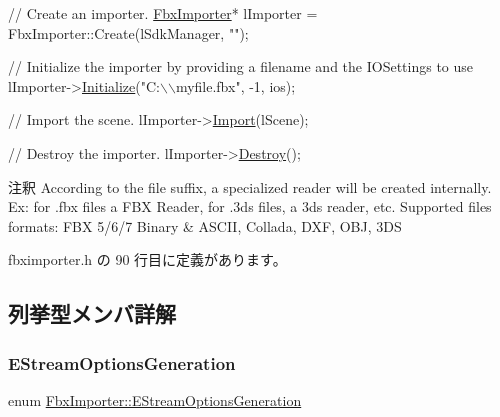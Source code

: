 \begin{DoxyEnumerate}
\begin{DoxyCode}
\textcolor{comment}{// Create an importer.}
\hyperlink{class_fbx_importer}{FbxImporter}* lImporter = FbxImporter::Create(lSdkManager, \textcolor{stringliteral}{""});

\textcolor{comment}{// Initialize the importer by providing a filename and the IOSettings to use}
lImporter->\hyperlink{class_fbx_importer_a70528a9ca1ff737bda9696a2073acd13}{Initialize}(\textcolor{stringliteral}{"C:\(\backslash\)\(\backslash\)myfile.fbx"}, -1, ios);

\textcolor{comment}{// Import the scene.}
lImporter->\hyperlink{class_fbx_importer_a1c5a7f9ee8a6952c1e039065cfa09659}{Import}(lScene); 

\textcolor{comment}{// Destroy the importer.}
lImporter->\hyperlink{class_fbx_object_a7b49e6a0c17132cd7e2e7e8485a08915}{Destroy}(); 
\end{DoxyCode}

\end{DoxyEnumerate}

\begin{DoxyRemark}{注釈}
According to the file suffix, a specialized reader will be created internally. Ex\+: for .fbx files a F\+BX Reader, for .3ds files, a 3ds reader, etc. Supported files formats\+: F\+BX 5/6/7 Binary \& A\+S\+C\+II, Collada, D\+XF, O\+BJ, 3\+DS 
\end{DoxyRemark}


 fbximporter.\+h の 90 行目に定義があります。



\subsection{列挙型メンバ詳解}
\mbox{\label{class_fbx_importer_a5174c9311e7e1295e7bf3338d209def5}} 
\subsubsection{\texorpdfstring{E\+Stream\+Options\+Generation}{EStreamOptionsGeneration}}
{\footnotesize\ttfamily enum \hyperlink{class_fbx_importer_a5174c9311e7e1295e7bf3338d209def5}{Fbx\+Importer\+::\+E\+Stream\+Options\+Generation}}


